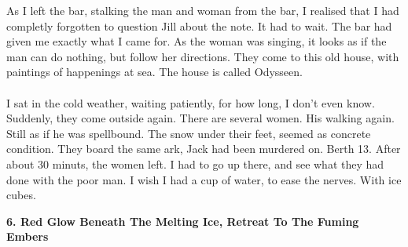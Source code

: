 \documentclass[]{article}
\begin{document}
As I left the bar, stalking the man and woman from the bar, I realised that I had completly forgotten to question Jill about the note. It had to wait. The bar had given me exactly what I came for. As the woman was singing, it looks as if the man can do nothing, but follow her directions. They come to this old house, with paintings of happenings at sea. The house is called Odysseen.
\\ \\
I sat in the cold weather, waiting patiently, for how long, I don't even know. Suddenly, they come outside again. There are several women. His walking again. Still as if he was spellbound. The snow under their feet, seemed as concrete condition. They board the same ark, Jack had been murdered on. Berth 13. After about 30 minuts, the women left. I had to go up there, and see what they had done with the poor man. I wish I had a cup of water, to ease the nerves. With ice cubes.

\newpage

\begin{center}
	\large\textbf{6. Red Glow Beneath The Melting Ice, \newline Retreat To The Fuming Embers}
\end{center}
\end{document}
